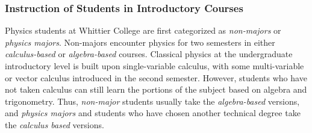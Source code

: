 \documentclass[../../main.tex]{subfiles}
\begin{document}
\subsubsection{Instruction of Students in Introductory Courses}

\label{sec:teaching_phil1}

Physics students at Whittier College are first categorized as \textit{non-majors} or \textit{physics majors}.  Non-majors encounter physics for two semesters in either \textit{calculus-based} or \textit{algebra-based} courses.  Classical physics at the undergraduate introductory level is built upon single-variable calculus, with some multi-variable or vector calculus introduced in the second semester.  However, students who have not taken calculus can still learn the portions of the subject based on algebra and trigonometry.  Thus, \textit{non-major} students usually take the \textit{algebra-based} versions, and \textit{physics majors} and students who have chosen another technical degree take the \textit{calculus based} versions.  \\ \hspace{0.1cm}
\end{document}
